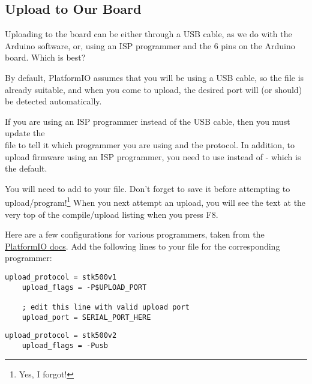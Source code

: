 \subsection{Upload to Our Board}\label{upload-to-our-board}

Uploading to the board can be either through a USB cable, as we do with the  Arduino software, or, using an ISP programmer and the 6 pins on the  Arduino board. Which is best?

By default, PlatformIO assumes that you will be using a USB cable, so the file  is already suitable, and when you come to upload, the desired port will (or should) be detected automatically.

If you are using an ISP programmer instead of the USB cable, then you must update the\\  file to tell it which programmer you are using and the protocol. In addition, to upload firmware using an ISP programmer, you need to use  instead of  - which is the default. 

You will need to add  to your  file. Don't forget to save it before attempting to upload/program!\footnote{Yes, I forgot!} When you next attempt an upload, you will see the text  at the very top of the compile/upload listing when you press F8.


Here are a few configurations for various programmers, taken from the \href{http://docs.platformio.org/en/latest/platforms/atmelavr.html?highlight=usbtiny#upload-using-programmer}{PlatformIO docs}. Add the following lines to your  file for the corresponding programmer:

\begin{lstlisting}[caption={The \inline{platformio.ini} additions for `AVRISP' ISP Programmer}]
    upload_protocol = stk500v1
    upload_flags = -P$UPLOAD_PORT

    ; edit this line with valid upload port
    upload_port = SERIAL_PORT_HERE
\end{lstlisting}


\begin{lstlisting}[caption={The \inline{platformio.ini} additions for `AVRISP MkII' Programmer}]
    upload_protocol = stk500v2
    upload_flags = -Pusb
\end{lstlisting}


